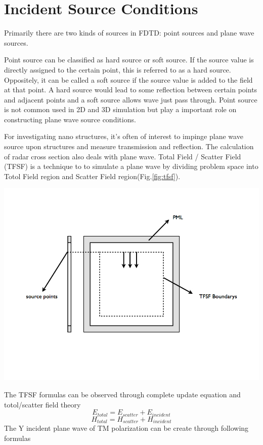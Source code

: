 \section{Incident Source Conditions}
Primarily there are two kinds of sources in FDTD: point sources and plane wave sources.

Point source can be classified as hard source or soft source. If the source value is directly assigned to the certain
point, this is referred to as a hard source. Oppositely, it can be called a soft source if the source value is added to
the field at that point. A hard source would lead to some reflection between certain points and adjacent points and a
soft source allows wave just pass through. Point source is not common used in 2D and 3D simulation but play a important
role on constructing plane wave source conditions.

For investigating nano structures, it's often of interest to impinge plane wave source upon structures and measure
transmission and reflection. The calculation of radar cross section also deals with plane wave. Total Field / Scatter
Field (TFSF) is a technique to to simulate a plane wave by dividing problem space into Totol Field region and Scatter
Field region(Fig.\ref{fig:tfsf}).
\begin{center}\label{fig:tfsf}
\includegraphics[scale=0.5]{images/tfsf.jpg}
\end{center}
The TFSF formulas can be observed through complete update equation and totol/scatter field theory
\begin{displaymath}
  E_{total}=E_{scatter}+E_{incident}
\end{displaymath}
\begin{displaymath}
  H_{total}=H_{scatter}+H_{incident}  
\end{displaymath}
The Y incident plane wave of TM polarization can be create through following formulas

